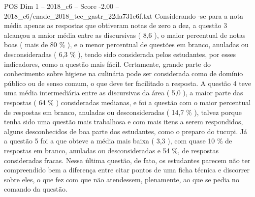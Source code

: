 \begin{textsample}{POS Dim 1 – 2018\_c6 – Score -2.00 – 2018\_c6/enade\_2018\_tec\_gastr\_22da731e6f.txt}
Considerando -se para a nota média apenas as respostas que obtiveram notas de zero a dez, a questão 3 alcançou a maior média entre as discursivas ( 8,6 ), o maior percentual de notas boas ( mais de 80 \% ), e o menor percentual de questões em branco, anuladas ou desconsideradas ( 6,3 \% ), tendo sido considerada pelos estudantes, por esses indicadores, como a questão mais fácil.
Certamente, grande parte do conhecimento sobre higiene na culinária pode ser considerada como de domínio público ou de senso comum, o que deve ter facilitado a resposta.
A questão 4 teve uma média intermediária entre as discursivas da área ( 5,0 ), a maior parte das respostas ( 64 \% ) consideradas medianas, e foi a questão com o maior percentual de respostas em branco, anuladas ou desconsideradas ( 14,7 \% ), talvez porque tenha sido uma questão mais trabalhosa e com mais itens a serem respondidos, alguns desconhecidos de boa parte dos estudantes, como o preparo do tucupi.
Já a questão 5 foi a que obteve a média mais baixa ( 3,3 ), com quase 10 \% de respostas em branco, anuladas ou desconsideradas e 54 \%, de respostas consideradas fracas.
Nessa última questão, de fato, os estudantes parecem não ter compreendido bem a diferença entre citar pontos de uma ficha técnica e discorrer sobre eles, o que fez com que não atendessem, plenamente, ao que se pedia no comando da questão.

\end{textsample}
